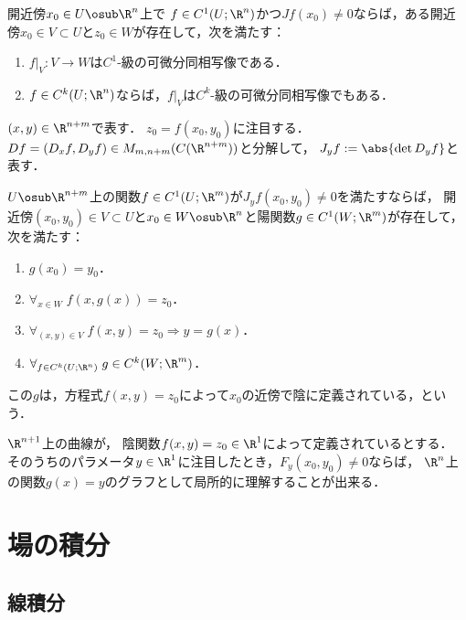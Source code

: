 \documentclass[uplatex,dvipdfmx]{jsreport}
\begin{document}
\begin{theorem}[逆関数定理]
    開近傍$x_0\in U\osub\R^n$上で
    $f\in C^1(U;\R^n)$かつ$Jf(x_0)\ne0$ならば，ある開近傍$x_0\in V\subset U$と$z_0\in W$が存在して，次を満たす：
    \begin{enumerate}
        \item $f|_V:V\to W$は$C^1$-級の可微分同相写像である．
        \item $f\in C^k(U;\R^n)$ならば，$f|_V$は$C^k$-級の可微分同相写像でもある．
    \end{enumerate}
\end{theorem}

\begin{notation}
    $(x,y)\in\R^{n+m}$で表す．
    $z_0=f(x_0,y_0)$に注目する．
    $Df=(D_xf,D_yf)\in M_{m,n+m}(C(\R^{n+m}))$と分解して，
    $J_yf:=\abs{\det D_yf}$と表す．
\end{notation}

\begin{theorem}[陰関数定理]\label{thm-Implicit-Function-Theorem}
    $U\osub\R^{n+m}$上の関数$f\in C^1(U;\R^m)$が$J_yf(x_0,y_0)\ne0$を満たすならば，
    開近傍$(x_0,y_0)\in V\subset U$と$x_0\in W\osub\R^n$と陽関数$g\in C^1(W;\R^m)$が存在して，次を満たす：
    \begin{enumerate}
        \item $g(x_0)=y_0$．
        \item $\forall_{x\in W}\;f(x,g(x))=z_0$．
        \item $\forall_{(x,y)\in V}\;f(x,y)=z_0\Rightarrow y=g(x)$．
        \item $\forall_{f\in C^k(U;\R^n)}\;g\in C^k(W;\R^m)$．
    \end{enumerate}
    この$g$は，方程式$f(x,y)=z_0$によって$x_0$の近傍で陰に定義されている，という．
\end{theorem}
\begin{remarks}
    $\R^{n+1}$上の曲線が，
    陰関数$f(x,y)=z_0\in\R^1$によって定義されているとする．
    そのうちのパラメータ$y\in\R^{1}$に注目したとき，$F_{y}(x_0,y_0)\ne0$ならば，
    $\R^{n}$上の関数$g(x)=y$のグラフとして局所的に理解することが出来る．
\end{remarks}

\section{場の積分}

\subsection{線積分}
\end{document}
